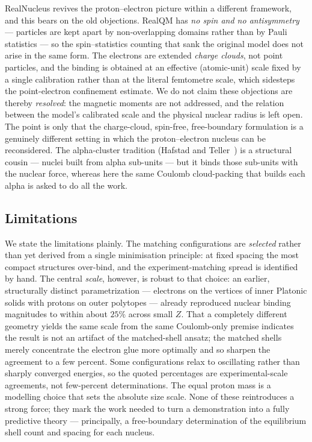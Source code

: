 \documentclass[11pt]{article}
\begin{document}
RealNucleus revives the proton--electron picture within a different framework, and this bears
on the old objections. RealQM has \emph{no spin and no antisymmetry} --- particles are kept
apart by non-overlapping domains rather than by Pauli statistics --- so the spin--statistics
counting that sank the original model does not arise in the same form. The electrons are
extended \emph{charge clouds}, not point particles, and the binding is obtained at an effective
(atomic-unit) scale fixed by a single calibration rather than at the literal femtometre scale,
which sidesteps the point-electron confinement estimate. We do not claim these objections are
thereby \emph{resolved}: the magnetic moments are not addressed, and the relation between the
model's calibrated scale and the physical nuclear radius is left open. The point is only that
the charge-cloud, spin-free, free-boundary formulation is a genuinely different setting in
which the proton--electron nucleus can be reconsidered. The alpha-cluster tradition (Hafstad
and Teller~\cite{HafstadTeller1938}) is a structural cousin --- nuclei built from alpha
sub-units --- but it binds those sub-units with the nuclear force, whereas here the same
Coulomb cloud-packing that builds each alpha is asked to do all the work.

\subsection{Limitations}

We state the limitations plainly. The matching configurations are \emph{selected} rather than
yet derived from a single minimisation principle: at fixed spacing the most compact structures
over-bind, and the experiment-matching spread is identified by hand. The central \emph{scale},
however, is robust to that choice: an earlier, structurally distinct parametrization --- electrons
on the vertices of inner Platonic solids with protons on outer polytopes --- already reproduced
nuclear binding magnitudes to within about $25\%$ across small $Z$. That a completely different
geometry yields the same scale from the same Coulomb-only premise indicates the result is not an
artifact of the matched-shell ansatz; the matched shells merely concentrate the electron glue more
optimally and so sharpen the agreement to a few percent. Some configurations relax
to oscillating rather than sharply converged energies, so the quoted percentages are
experimental-scale agreements, not few-percent determinations. The equal proton mass is a
modelling choice that sets the absolute size scale. None of these reintroduces a strong force;
they mark the work needed to turn a demonstration into a fully predictive theory --- principally,
a free-boundary determination of the equilibrium shell count and spacing for each nucleus.
\end{document}
